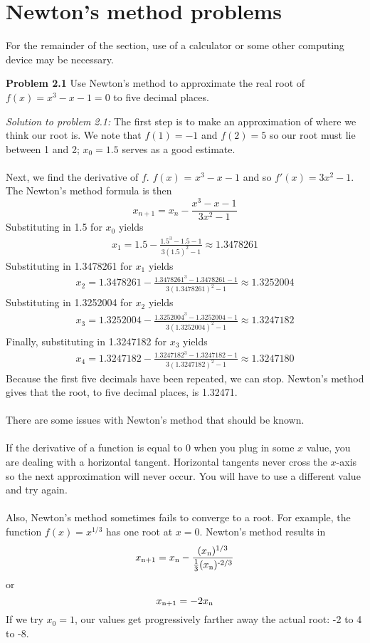 \documentclass[11pt]{scrartcl}
\begin{document}
\section{Newton's method problems} 
\noindent 
For the remainder of the section, use of a calculator or some other computing device may be necessary. 
\begin{tcolorbox}
[colback=purple!5!white,colframe=purple!75!black]
\textbf{Problem 2.1} Use Newton's method to approximate the real root of $f(x)=x^3 - x - 1 = 0$ to five decimal places. 
\end{tcolorbox}
\noindent 
\textit{Solution to problem 2.1:} 
\noindent 
The first step is to make an approximation of where we think our root is. We note that $f(1)=-1$ and $f(2)=5$ so our root must lie between 1 and 2; $x_0=1.5$ serves as a good estimate. \\
\\
\noindent 
Next, we find the derivative of $f$. $f(x)$ = $x^3 - x - 1$ and so $f'(x)=3x^2-1$. The Newton's method formula is then 
$$x_{n+1}=x_n-\frac{x^3-x-1}{3x^2-1}$$
Substituting in 1.5 for $x_0$ yields 
\begin{align*}
    x_1 =1.5-\frac{1.5^3-1.5-1}{3(1.5)^2-1} \approx 1.3478261
\end{align*} 
Substituting in 1.3478261 for $x_1$ yields 
\begin{align*}
    x_2 =1.3478261-\frac{1.3478261^3-1.3478261-1}{3(1.3478261)^2-1} \approx 1.3252004
\end{align*}
Substituting in 1.3252004 for $x_2$ yields 
\begin{align*}
    x_3 =1.3252004-\frac{1.3252004^3-1.3252004-1}{3(1.3252004)^2-1} \approx 1.3247182
\end{align*}
Finally, substituting in 1.3247182 for $x_3$ yields 
\begin{align*}
    x_4 =1.3247182-\frac{1.3247182^3-1.3247182-1}{3(1.3247182)^2-1} \approx 1.3247180
\end{align*}
\noindent 
Because the first five decimals have been repeated, we can stop. Newton's method gives that the root, to five decimal places, is 1.32471.\\
\\
\noindent 
There are some issues with Newton's method that should be known. \\
\\
\noindent 
If the derivative of a function is equal to 0 when you plug in some $x$ value, you are dealing with a horizontal tangent. Horizontal tangents never cross the $x$-axis so the next approximation will never occur. You will have to use a different value and try again.\\
\\
\noindent 
Also, Newton's method sometimes fails to converge to a root. For example, the function $f(x)=x^{1/3}$ has one root at $x=0$. Newton's method results in
$$x\textsubscript{n+1} = x\textsubscript{n} - \frac{(x\textsubscript{n})\textsuperscript{1/3}}{\frac{1}{3}(x\textsubscript{n})\textsuperscript{-2/3}}$$
or $$x\textsubscript{n+1} = -2x\textsubscript{n}$$
If we try $x_0=1$, our values get progressively farther away the actual root: -2 to 4 to -8.
\end{document}
